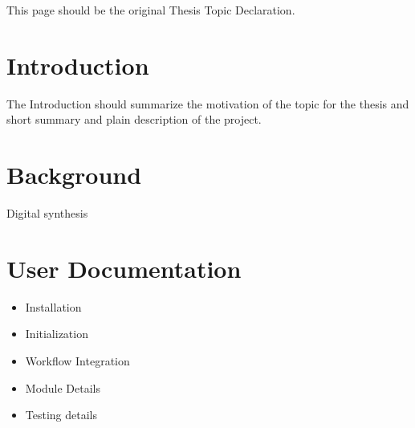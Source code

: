 \documentclass[a4paper,12pt]{report}
\begin{document}




\vspace*{\fill}
\begin{center}
This page should be the original Thesis Topic Declaration.
\end{center}
\vfill
\thispagestyle{empty}
\newpage
\setcounter{page}{1}


\tableofcontents



\chapter{Introduction}

The Introduction should summarize the motivation of the topic for the thesis and short summary and plain description of the project.



\chapter{Background}
Digital synthesis 

\chapter{User Documentation}


\begin{itemize}
    \item Installation
    \item Initialization
    \item Workflow Integration
    \item Module Details
    \item Testing details
\end{itemize}
\end{document}
